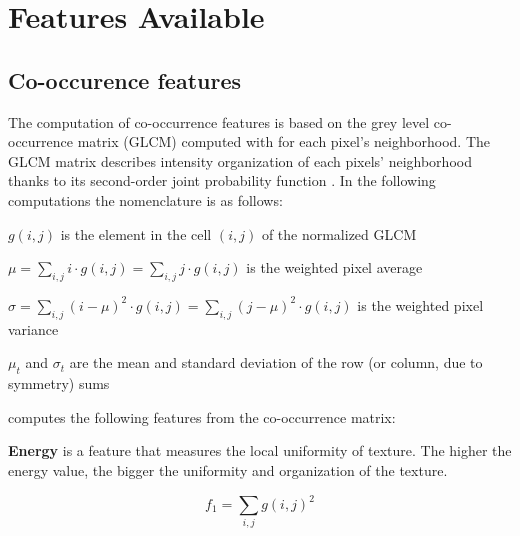 \documentclass{InsightArticle}
\begin{document}
\section{Features Available}
\label{sec:features}

\subsection{Co-occurence features}
\label{sec:coocFeat}

The computation of co-occurrence features is based on the grey level co-occurrence matrix (GLCM) computed with  for each pixel's neighborhood. The GLCM matrix describes intensity organization of each pixels' neighborhood thanks to its second-order joint probability function \cite{coocFeat1,coocFeat2,coocFeat3,coocFeat4}. In the following computations the nomenclature is as follows:

\begin{math} g(i,j) \end{math} is the element in the cell \begin{math}(i,j)\end{math} of the normalized GLCM

\begin{math} \mu = \sum_{i,j}\nolimits i \cdot g(i, j) = \sum_{i,j}\nolimits j \cdot g(i, j) \end{math} is the weighted pixel average

\begin{math} \sigma = \sum_{i,j}\nolimits (i - \mu)^2 \cdot g(i, j) = \sum_{i,j}\nolimits (j- \mu)^2 \cdot g(i, j) \end{math} is the weighted pixel variance

\begin{math} \mu_t \end{math} and \begin{math} \sigma_t \end{math} are the mean and standard deviation of the row (or column, due to symmetry) sums

 computes the following features from the co-occurrence matrix:

\textbf{Energy} is a feature that measures the local uniformity of texture. The higher the energy value, the bigger the uniformity and organization of the texture.

\begin{equation} \label{eqn:ShapeInfluenceTerm}
f_1 = \sum_{i,j}\nolimits g(i, j)^2
\end{equation}
\end{document}
